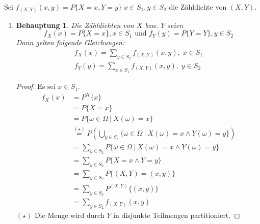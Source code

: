 \documentclass[a4paper]{scrartcl}
\newtheorem*{behaupt}{Behauptung}
\begin{document}
\begin{enumerate}[label=\bfseries\arabic*.]
        Sei $f_{(X,Y)}(x,y) = P\{X = x, Y = y\}\; x \in S_1, y \in S_2$ die
        Zähldichte von $(X, Y)$.
        \begin{enumerate}[label=(\alph*)]
            \item
                \begin{behaupt}
                    Die Zähldichten von $X$ bzw. $Y$ seien
                    \[f_X(x) = P\{X = x\}, x \in S_1
                    \text{ und } f_Y(y) = P\{Y = Y\}, y \in S_2\] 
                    Dann gelten folgende Gleichungen:
                    \begin{align*}
                    f_X(x) = \sum_{y \in S_2} f_{(X,Y)}(x, y), \; x \in S_1 \\
                    f_Y(y) = \sum_{x \in S_1} f_{(X,Y)}(x, y), \; y \in S_2
                    \end{align*}
                \end{behaupt}
                \begin{proof}
                    Es sei $x \in S_1$.
                    \begin{equation*}
                        \begin{split}
                            f_X(x) &= P^X\{ x \} \\
                            &= P\{ X = x \} \\
                            &= P\{ \omega \in \Omega \ |\ X(\omega) = x \} \\
                            &\stackrel{(\star)}{=} P \left( \bigcup_{y \in S_2}
                                \{ \omega \in \Omega \ |\ X(\omega) = x
                                \land Y(\omega) = y \} \right) \\
                            &= \sum_{y \in S_2} P \{ \omega \in \Omega \ |\ 
                                X(\omega) = x \land Y(\omega) = y \} \\                                      
                            &= \sum_{y \in S_2} P \{ X = x \land Y = y \} \\
                            &= \sum_{y \in S_2} P \{ (X, Y) = (x, y) \} \\
                            &= \sum_{y \in S_2} P^{(X, Y)} \{ (x, y) \} \\
                            &= \sum_{y \in S_2} f_{(X, Y)} (x, y)
                        \end{split}
                    \end{equation*}
                    $(\star)$ Die Menge wird durch $Y$ in disjunkte Teilmengen
                    partitioniert.


\end{proof}
\end{enumerate}
\end{enumerate}
\end{document}
